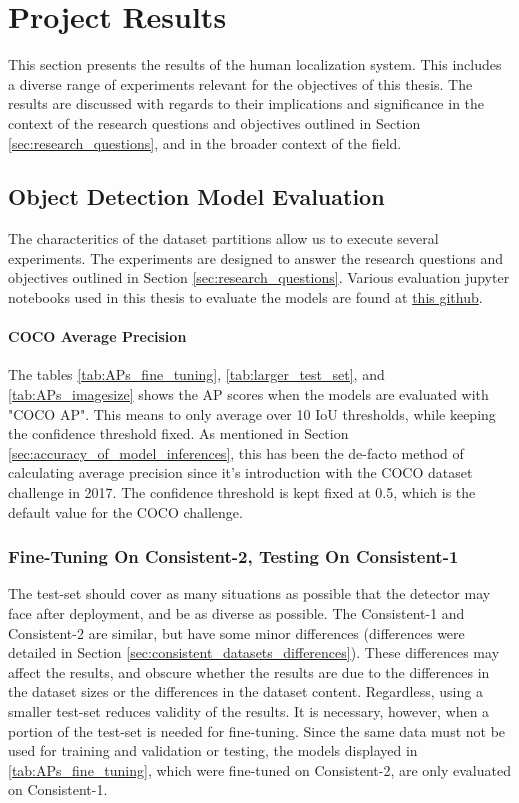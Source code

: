 \section{Project Results}
\label{sec:results}
This section presents the results of the human localization system. This includes a diverse range of experiments relevant for the objectives of this thesis. The results are discussed with regards to their implications and significance in the context of the research questions and objectives outlined in Section \ref{sec:research_questions}, and in the broader context of the field.


\subsection{Object Detection Model Evaluation}
\label{sec:object_detection_model_evaluation}
The characteritics of the dataset partitions allow us to execute several experiments. The experiments are designed to answer the research questions and objectives outlined in Section \ref{sec:research_questions}. Various evaluation jupyter notebooks used in this thesis to evaluate the models are found at \href{github.com/hallvaeb/masterthesis}{this github}. 

\paragraph{COCO Average Precision}
The tables \ref{tab:APs_fine_tuning}, \ref{tab:larger_test_set}, and \ref{tab:APs_imagesize} shows the AP scores when the models are evaluated with "COCO AP". This means to only average over 10 IoU thresholds, while keeping the confidence threshold fixed. As mentioned in Section \ref{sec:accuracy_of_model_inferences}, this has been the de-facto method of calculating average precision since it's introduction with the COCO dataset challenge in 2017. The confidence threshold is kept fixed at 0.5, which is the default value for the COCO challenge.


\subsubsection{Fine-Tuning On Consistent-2, Testing On Consistent-1}
The test-set should cover as many situations as possible that the detector may face after deployment, and be as diverse as possible. The Consistent-1 and Consistent-2 are similar, but have some minor differences (differences were detailed in Section \ref{sec:consistent_datasets_differences}). These differences may affect the results, and obscure whether the results are due to the differences in the dataset sizes or the differences in the dataset content. Regardless, using a smaller test-set reduces validity of the results. It is necessary, however, when a portion of the test-set is needed for fine-tuning. Since the same data must not be used for training and validation or testing, the models displayed in \ref{tab:APs_fine_tuning}, which were fine-tuned on Consistent-2, are only evaluated on Consistent-1.

